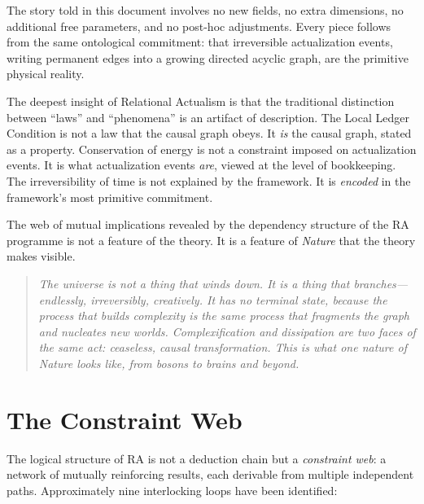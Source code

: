 \documentclass[11pt,a4paper]{article}
\theoremstyle{plain}
\theoremstyle{definition}
\theoremstyle{remark}
\begin{document}
The story told in this document involves no new fields, no extra
dimensions, no additional free parameters, and no post-hoc adjustments.
Every piece follows from the same ontological commitment: that
irreversible actualization events, writing permanent edges into a growing
directed acyclic graph, are the primitive physical reality.

The deepest insight of Relational Actualism is that the traditional
distinction between ``laws'' and ``phenomena'' is an artifact of
description.  The Local Ledger Condition is not a law that the causal
graph obeys.  It \emph{is} the causal graph, stated as a property.
Conservation of energy is not a constraint imposed on actualization
events.  It is what actualization events \emph{are}, viewed at the level
of bookkeeping.  The irreversibility of time is not explained by the
framework.  It is \emph{encoded} in the framework's most primitive
commitment.

The web of mutual implications revealed by the dependency structure of
the RA programme is not a feature of the theory.  It is a feature of
\emph{Nature} that the theory makes visible.

\begin{quote}\itshape
The universe is not a thing that winds down.  It is a thing that
branches---endlessly, irreversibly, creatively.  It has no terminal state,
because the process that builds complexity is the same process that
fragments the graph and nucleates new worlds.  Complexification and
dissipation are two faces of the same act: ceaseless, causal
transformation.  This is what one nature of Nature looks like, from bosons
to brains and beyond.
\end{quote}

\section{The Constraint Web}\label{sec:constraintweb}

The logical structure of RA is not a deduction chain but a
\emph{constraint web}: a network of mutually reinforcing results, each
derivable from multiple independent paths.  Approximately nine
interlocking loops have been identified:
\end{document}
